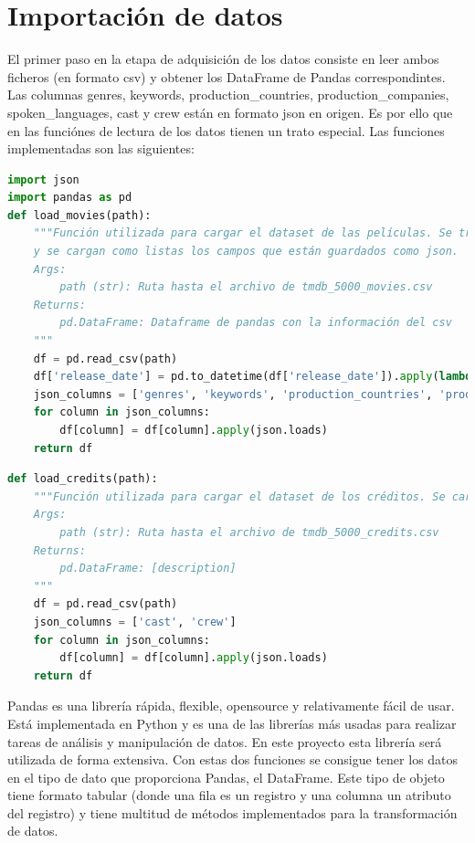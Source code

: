 \newpage
\section{Importación de datos}

El primer paso en la etapa de adquisición de los datos consiste en leer ambos ficheros (en formato csv) y obtener los DataFrame de Pandas correspondintes. Las columnas genres, keywords, production\_countries, production\_companies, spoken\_languages, cast y crew están en formato json en origen. Es por ello que en las funciónes de lectura de los datos tienen un trato especial. Las funciones implementadas son las siguientes:

\begin{lstlisting}[language=Python, caption=Lectura de los datos del fichero de películas.]
import json
import pandas as pd
def load_movies(path):
    """Función utilizada para cargar el dataset de las películas. Se transforma a fecha el campo de fecha de salida
    y se cargan como listas los campos que están guardados como json.
    Args:
        path (str): Ruta hasta el archivo de tmdb_5000_movies.csv
    Returns:
        pd.DataFrame: Dataframe de pandas con la información del csv
    """
    df = pd.read_csv(path)
    df['release_date'] = pd.to_datetime(df['release_date']).apply(lambda x: x.date())
    json_columns = ['genres', 'keywords', 'production_countries', 'production_companies', 'spoken_languages']
    for column in json_columns:
        df[column] = df[column].apply(json.loads)
    return df
\end{lstlisting}

\begin{lstlisting}[language=Python, caption=Lectura de los datos del fichero de créditos.]
def load_credits(path):
    """Función utilizada para cargar el dataset de los créditos. Se cargan como listas los campos que están guardado
    Args:
        path (str): Ruta hasta el archivo de tmdb_5000_credits.csv
    Returns:
        pd.DataFrame: [description]
    """
    df = pd.read_csv(path)
    json_columns = ['cast', 'crew']
    for column in json_columns:
        df[column] = df[column].apply(json.loads)
    return df
\end{lstlisting}

Pandas es una librería rápida, flexible, opensource y relativamente fácil de usar. Está implementada en Python y es una de las librerías más usadas para realizar tareas de análisis y manipulación de datos. En este proyecto esta librería será utilizada de forma extensiva. Con estas dos funciones se consigue tener los datos en el tipo de dato que proporciona Pandas, el DataFrame. Este tipo de objeto tiene formato tabular (donde una fila es un registro y una columna un atributo del registro) y tiene multitud de métodos implementados para la transformación de datos.\\

